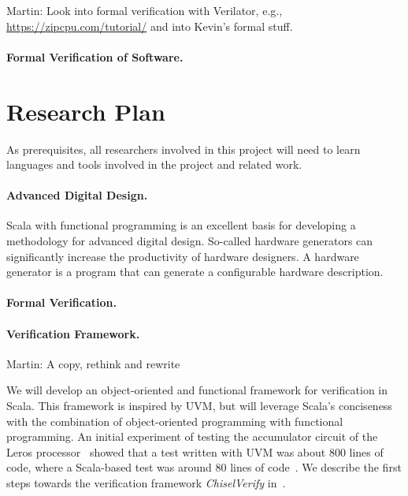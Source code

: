 \documentclass[fleqn,12pt]{article}
\newcommand{\martin}[1]{{\color{blue} Martin: #1}}
\begin{document}
\martin{Look into formal verification with Verilator, e.g., \url{https://zipcpu.com/tutorial/}
and into Kevin's formal stuff.}

\paragraph{Formal Verification of Software.}





\section{Research Plan}

As prerequisites, all researchers involved in this project will need to learn
languages and tools involved in the project and related work.


\paragraph{Advanced Digital Design.}

Scala with functional programming is an excellent basis for developing a methodology for
advanced digital design.
So-called hardware generators can significantly increase the productivity of hardware designers.
A hardware generator is a program that can generate a configurable
hardware description.


\paragraph{Formal Verification.}





\paragraph{Verification Framework.}

\martin{A copy, rethink and rewrite}

We will develop an object-oriented and functional framework for verification in Scala.
This framework is inspired by UVM, but will leverage Scala's conciseness with the
combination of object-oriented programming with functional programming.
An initial experiment of testing the accumulator circuit of the Leros processor~\cite{leros:arcs2019}
showed that a test written with UVM was about 800 lines of code, where a Scala-based
test was around 80 lines of code~\cite{verify:chisel:2020}.
We describe the first steps towards the verification framework \emph{ChiselVerify} in~\cite{ChiselVerify:2021}.
\end{document}
